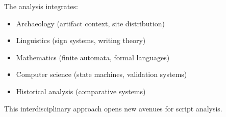 The analysis integrates:
\begin{itemize}
    \item Archaeology (artifact context, site distribution)
    \item Linguistics (sign systems, writing theory)
    \item Mathematics (finite automata, formal languages)
    \item Computer science (state machines, validation systems)
    \item Historical analysis (comparative systems)
\end{itemize}

This interdisciplinary approach opens new avenues for script analysis.
